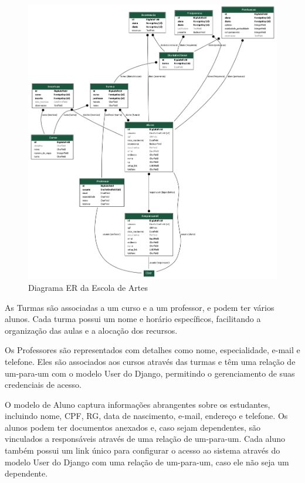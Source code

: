 \begin{figure}[htb]
	\caption{\label{fig_er_escola}Diagrama ER da Escola de Artes}
	\begin{center}
	    \includegraphics[scale=0.35]{./img/er_diagram_escola.png}
	\end{center}
\end{figure}

As Turmas são associadas a um curso e a um professor, e podem ter vários alunos. Cada turma possui um nome e horário específicos, facilitando a organização das aulas e a alocação dos recursos.

Os Professores são representados com detalhes como nome, especialidade, e-mail e telefone. Eles são associados aos cursos através das turmas e têm uma relação de um-para-um com o modelo User do Django, permitindo o gerenciamento de suas credenciais de acesso.

O modelo de Aluno captura informações abrangentes sobre os estudantes, incluindo nome, CPF, RG, data de nascimento, e-mail, endereço e telefone. Os alunos podem ter documentos anexados e, caso sejam dependentes, são vinculados a responsáveis através de uma relação de um-para-um. Cada aluno também possui um link único para configurar o acesso ao sistema através do modelo User do Django com uma relação de um-para-um, caso ele não seja um dependente.

